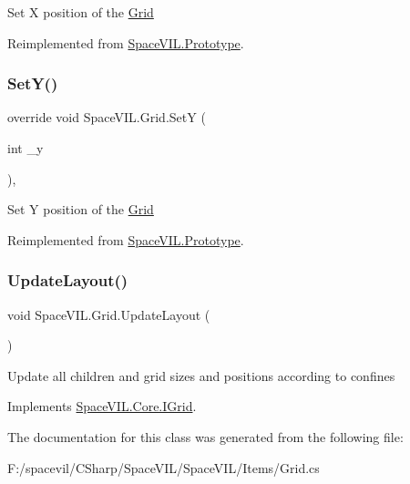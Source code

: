 Set X position of the \mbox{\hyperlink{class_space_v_i_l_1_1_grid}{Grid}} 



Reimplemented from \mbox{\hyperlink{class_space_v_i_l_1_1_prototype}{Space\+V\+I\+L.\+Prototype}}.

\mbox{\label{class_space_v_i_l_1_1_grid_a37ea23fcafda8c5fd8cc8fc41101a20d}} 
\subsubsection{\texorpdfstring{Set\+Y()}{SetY()}}
{\footnotesize\ttfamily override void Space\+V\+I\+L.\+Grid.\+SetY (\begin{DoxyParamCaption}\item[{int}]{\+\_\+y }\end{DoxyParamCaption})\hspace{0.3cm}{\ttfamily [inline]}, {\ttfamily [virtual]}}



Set Y position of the \mbox{\hyperlink{class_space_v_i_l_1_1_grid}{Grid}} 



Reimplemented from \mbox{\hyperlink{class_space_v_i_l_1_1_prototype}{Space\+V\+I\+L.\+Prototype}}.

\mbox{\label{class_space_v_i_l_1_1_grid_a3cc929016738df7ef25e984338255a55}} 
\subsubsection{\texorpdfstring{Update\+Layout()}{UpdateLayout()}}
{\footnotesize\ttfamily void Space\+V\+I\+L.\+Grid.\+Update\+Layout (\begin{DoxyParamCaption}{ }\end{DoxyParamCaption})\hspace{0.3cm}{\ttfamily [inline]}}



Update all children and grid sizes and positions according to confines 



Implements \mbox{\hyperlink{interface_space_v_i_l_1_1_core_1_1_i_grid}{Space\+V\+I\+L.\+Core.\+I\+Grid}}.



The documentation for this class was generated from the following file\+:\begin{DoxyCompactItemize}
\item 
F\+:/spacevil/\+C\+Sharp/\+Space\+V\+I\+L/\+Space\+V\+I\+L/\+Items/Grid.\+cs\end{DoxyCompactItemize}
